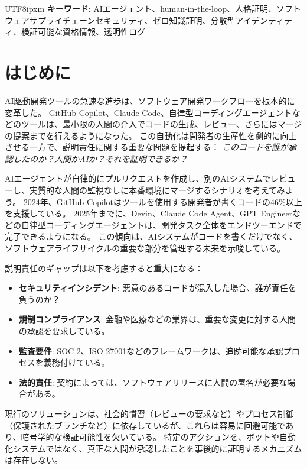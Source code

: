 \documentclass[a4paper,10pt]{article}
\begin{document}
\begin{CJK}{UTF8}{ipxm}
\textbf{キーワード}: AIエージェント、human-in-the-loop、人格証明、ソフトウェアサプライチェーンセキュリティ、ゼロ知識証明、分散型アイデンティティ、検証可能な資格情報、透明性ログ

\section{はじめに}

AI駆動開発ツールの急速な進歩は、ソフトウェア開発ワークフローを根本的に変革した。
GitHub Copilot、Claude Code、自律型コーディングエージェントなどのツールは、最小限の人間の介入でコードの生成、レビュー、さらにはマージの提案までを行えるようになった。
この自動化は開発者の生産性を劇的に向上させる一方で、説明責任に関する重要な問題を提起する：
\textit{このコードを誰が承認したのか？人間かAIか？それを証明できるか？}

AIエージェントが自律的にプルリクエストを作成し、別のAIシステムでレビューし、実質的な人間の監視なしに本番環境にマージするシナリオを考えてみよう。
2024年、GitHub Copilotはツールを使用する開発者が書くコードの46\%以上を支援している。
2025年までに、Devin、Claude Code Agent、GPT Engineerなどの自律型コーディングエージェントは、開発タスク全体をエンドツーエンドで完了できるようになる。
この傾向は、AIシステムがコードを書くだけでなく、ソフトウェアライフサイクルの重要な部分を管理する未来を示唆している。

説明責任のギャップは以下を考慮すると重大になる：
\begin{itemize}
    \item \textbf{セキュリティインシデント}: 悪意のあるコードが混入した場合、誰が責任を負うのか？
    \item \textbf{規制コンプライアンス}: 金融や医療などの業界は、重要な変更に対する人間の承認を要求している。
    \item \textbf{監査要件}: SOC 2、ISO 27001などのフレームワークは、追跡可能な承認プロセスを義務付けている。
    \item \textbf{法的責任}: 契約によっては、ソフトウェアリリースに人間の署名が必要な場合がある。
\end{itemize}

現行のソリューションは、社会的慣習（レビューの要求など）やプロセス制御（保護されたブランチなど）に依存しているが、これらは容易に回避可能であり、暗号学的な検証可能性を欠いている。
特定のアクションを、ボットや自動化システムではなく、真正な人間が承認したことを事後的に証明するメカニズムは存在しない。


\end{CJK}
\end{document}
